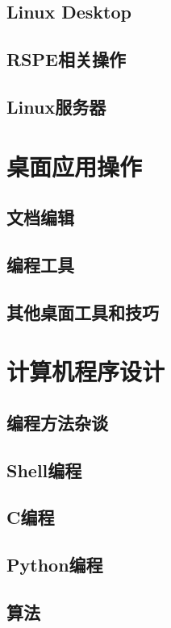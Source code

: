 \documentclass[11pt,a4paper]{report}
\begin{document}
\chapter{Linux Desktop}

\chapter{RSPE相关操作}

\chapter{Linux服务器}


\part{桌面应用操作}

\chapter{文档编辑}

\chapter{编程工具}

\chapter{其他桌面工具和技巧}


\part{计算机程序设计}
\chapter{编程方法杂谈}

\chapter{Shell编程}

\chapter{C编程}

\chapter{Python编程}

\chapter{算法}



\end{document}

